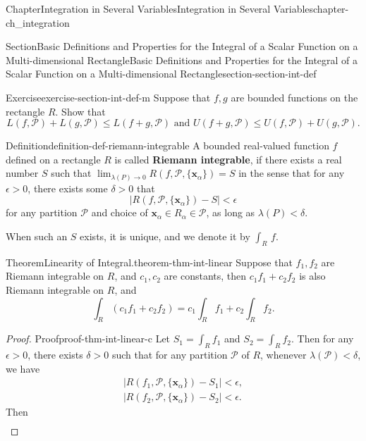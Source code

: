 \documentclass[oneside,10pt,]{book}
\newcommand{\terminology}[1]{\textbf{#1}}
\numberwithin{equation}{section}
\newcommand{\bx}{\mathbf{x}}
\newcommand{\cP}{\mathcal{P}}
\begin{document}
\begin{chapterptx}{Chapter}{Integration in Several Variables}{}{Integration in Several Variables}{}{}{chapter-ch_integration}
\begin{sectionptx}{Section}{Basic Definitions and Properties for the Integral of a Scalar Function on a Multi-dimensional Rectangle}{}{Basic Definitions and Properties for the Integral of a Scalar Function on a Multi-dimensional Rectangle}{}{}{section-section-int-def}
\begin{inlineexercise}{Exercise}{}{exercise-section-int-def-m}%
Suppose that \(f, g\) are bounded functions on the rectangle \(R\). Show that%
\begin{equation*}
L(f,\cP)+L(g, \cP)\le L(f+g, \cP) \text{ and } U(f+g, \cP)\le U(f, \cP) +U(g, \cP)\text{.}
\end{equation*}
%
\end{inlineexercise}%
\begin{definition}{Definition}{}{definition-def-riemann-integrable}%
%
\label{notation-def-riemann-integrable-b}%
A bounded real-valued function \(f\) defined on a rectangle \(R\) is called \terminology{Riemann integrable}, if there exists a real number \(S\) such that \(\lim_{\lambda(P)\to 0} R(f, \cP, \{\bx_{\alpha}\})=S\) in the sense that for any \(\epsilon >0\), there exists some \(\delta >0\) that%
\begin{equation*}
\vert R(f, \cP, \{\bx_{\alpha}\}) -S\vert < \epsilon
\end{equation*}
for any partition \(\cP\) and choice of \(\bx_{\alpha}\in R_{\alpha}\in \cP\), as long as \(\lambda(P) < \delta\).%
\par
When such an \(S\) exists, it is unique, and we denote it by \(\int_{R}\, f\).%
\end{definition}
\begin{theorem}{Theorem}{Linearity of Integral.}{}{theorem-thm-int-linear}%
Suppose that \(f_{1}, f_{2}\) are Riemann integrable on \(R\), and \(c_{1}, c_{2}\) are constants, then \(c_{1}f_{1}+c_{2}f_{2}\) is also Riemann integrable on \(R\), and%
\begin{equation}
\int_{R}\left( c_{1}f_{1}+c_{2}f_{2}\right) 
= c_{1} \int_{R} f_{1} + c_{2} \int_{R} f_{2}.\label{men-eqn-int-linearity}
\end{equation}
%
\end{theorem}
\begin{proof}{Proof}{}{proof-thm-int-linear-c}
Let \(S_{1}= \int_{R} f_{1}\) and \(S_{2}= \int_{R} f_{2}\). Then for any \(\epsilon >0\), there exists \(\delta>0\) such that for any partition \(\cP\) of \(R\), whenever \(\lambda (\cP) < \delta\), we have%
\begin{gather*}
\vert R(f_{1}, \cP, \{\bx_{\alpha}\}) -S_{1}\vert < \epsilon,\\
\vert R(f_{2}, \cP, \{\bx_{\alpha}\}) -S_{2}\vert < \epsilon.
\end{gather*}
Then%
\begin{align*}

\end{align*}
\end{proof}
\end{sectionptx}
\end{chapterptx}
\end{document}
